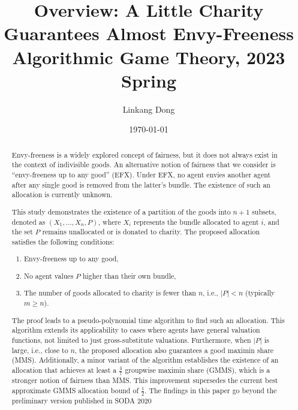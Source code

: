 \documentclass{article}
\title{
   \textbf{Overview: A Little Charity Guarantees Almost Envy-Freeness } \\ 
   \large Algorithmic Game Theory, 2023 Spring\footnotemark[1]
}
\author{Linkang Dong\footnotemark[2]}
\date{\today}
\begin{document}
\maketitle
{}

\begin{abstract}

    Envy-freeness is a widely explored concept of fairness, but it does not always exist in the context of indivisible goods. An alternative notion of fairness that we consider is “envy-freeness up to any good” (EFX). Under EFX, no agent envies another agent after any single good is removed from the latter's bundle. The existence of such an allocation is currently unknown.
    
    This study\cite{chaudhury2020little} demonstrates the existence of a partition of the goods into $n+1$ subsets, denoted as $(X_1, \ldots, X_n, P)$, where $X_i$ represents the bundle allocated to agent $i$, and the set $P$ remains unallocated or is donated to charity. The proposed allocation satisfies the following conditions:
    
    \begin{enumerate}
        \item Envy-freeness up to any good,
        \item No agent values $P$ higher than their own bundle,
        \item The number of goods allocated to charity is fewer than $n$, i.e., $|P| < n$ (typically $m \geq n$).
    \end{enumerate}
    
    The proof leads to a pseudo-polynomial time algorithm to find such an allocation. This algorithm extends its applicability to cases where agents have general valuation functions, not limited to just gross-substitute valuations. Furthermore, when $|P|$ is large, i.e., close to $n$, the proposed allocation also guarantees a good maximin share (MMS). Additionally, a minor variant of the algorithm establishes the existence of an allocation that achieves at least a $\frac{4}{7}$ groupwise maximin share (GMMS), which is a stronger notion of fairness than MMS. This improvement supersedes the current best approximate GMMS allocation bound of $\frac{1}{2}$. The findings in this paper go beyond the preliminary version published in SODA 2020~\cite{doi:10.1137/20M1359134} \footnotemark[3]

\end{abstract}
\end{document}
